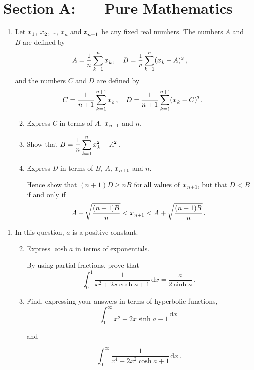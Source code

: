 \documentclass[a4, 11pt]{report}
\newlength{\qspace}
\newcounter{qnumber}
\newenvironment{question}%
 {\vspace{\qspace}
  \begin{enumerate}[\bfseries 1\quad][10]%
    \setcounter{enumi}{\value{qnumber}}%
    \item%
 }
{
  \end{enumerate}
  \filbreak
  \stepcounter{qnumber}
 }
\newenvironment{questionparts}[1][1]%
 {
  \begin{enumerate}[\bfseries (i)]%
    \setcounter{enumii}{#1}
    \addtocounter{enumii}{-1}
    \setlength{\itemsep}{5mm}
    \setlength{\parskip}{8pt}
 }
 {
  \end{enumerate}
 }
\def\d{{\mathrm d}}
\newcommand{\low}{^{\vphantom{()}}}
\def\ge{\geqslant}
\begin{document}
\setcounter{page}{2}

 
\section*{Section A: \ \ \ Pure Mathematics}

\begin{question}
Let $x_{\low1}$, $x_{\low2}$, \ldots, $x_n$ and 
$x_{\vphantom {\dot A} n+1}$ be any fixed real numbers.
The numbers $A$ and $B$ are defined by
\[ 
A = \frac 1 n 
\sum_{k=1}^n x_{ \low k}
 \,, \ \ \ 
B= \frac 1 n 
 \sum_{k=1}^n (x_{\low k}-A)^2
\,,  \ \ \
\]
and the numbers $C$ and $D$ are defined by
\[
 C = \frac 1 {n+1}
\sum\limits_{k=1}^{n+1} x_{\low k} 
\,, 
\ \ \
 D = \frac1{n+1} 
\sum_{k=1}^{n+1} (x_{\low k}-C)^2
\,.
\]              
\begin{questionparts}
\item
 Express $ C$  in terms of $A$,  $x_{\low n+1}$ and $n$. 
\item Show that $ \displaystyle 
B= \frac 1 n
 \sum_{k=1}^n x_{\low k}^2
- A^2\,$. 
\item  Express $D $  in terms of $B$, $A$,  $x_{\low n+1}$ and $n$.

Hence show that $(n + 1)D  \ge nB$ 
for all values of $x_{\low n+1}$, but that $D  < B$
if and only if
\[
A-\sqrt{\frac{(n+1)B}{n}}<x_{\low n+1}<    
A+\sqrt{\frac{(n+1)B}{n}}\,.
\]  
\end{questionparts}
\end{question}

\begin{question}
In this question, $a$ is a positive constant.
\begin{questionparts}
\item  Express $\cosh a$ in terms of exponentials. 

By using partial fractions, prove that
\[
\int_0^1 \frac 1{ x^2 +2x\cosh a +1} \, \d x = \frac a {2\sinh a}\,. 
\]

\item Find, expressing your answers in terms of hyperbolic functions, 
\[
\int_1^\infty \frac 1 {x^2 +2x \sinh a -1} \,\d x
\,
\]

and 

\[
\int_0^\infty \frac 1 {x^4 +2x^2\cosh a +1} \,\d x
\,.\]

\end{questionparts}

\end{question}
\end{document}
